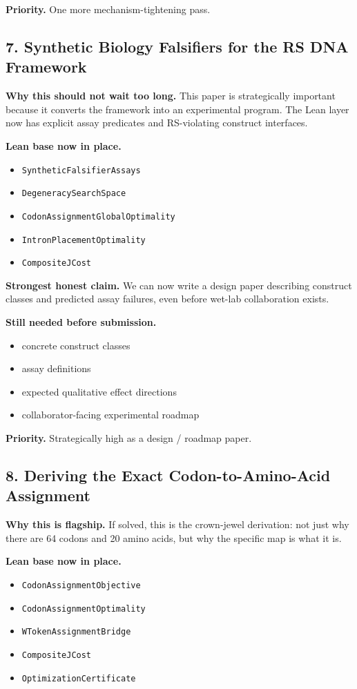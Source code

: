 \documentclass[11pt]{article}
\begin{document}
\textbf{Priority.} One more mechanism-tightening pass.

\subsection*{7. Synthetic Biology Falsifiers for the RS DNA Framework}
\textbf{Why this should not wait too long.} This paper is strategically important because it converts the framework into an experimental program. The Lean layer now has explicit assay predicates and RS-violating construct interfaces.

\textbf{Lean base now in place.}
\begin{itemize}
\item \texttt{SyntheticFalsifierAssays}
\item \texttt{DegeneracySearchSpace}
\item \texttt{CodonAssignmentGlobalOptimality}
\item \texttt{IntronPlacementOptimality}
\item \texttt{CompositeJCost}
\end{itemize}

\textbf{Strongest honest claim.} We can now write a design paper describing construct classes and predicted assay failures, even before wet-lab collaboration exists.

\textbf{Still needed before submission.}
\begin{itemize}
\item concrete construct classes
\item assay definitions
\item expected qualitative effect directions
\item collaborator-facing experimental roadmap
\end{itemize}

\textbf{Priority.} Strategically high as a design / roadmap paper.

\subsection*{8. Deriving the Exact Codon-to-Amino-Acid Assignment}
\textbf{Why this is flagship.} If solved, this is the crown-jewel derivation: not just why there are 64 codons and 20 amino acids, but why the specific map is what it is.

\textbf{Lean base now in place.}
\begin{itemize}
\item \texttt{CodonAssignmentObjective}
\item \texttt{CodonAssignmentOptimality}
\item \texttt{WTokenAssignmentBridge}
\item \texttt{CompositeJCost}
\item \texttt{OptimizationCertificate}
\end{itemize}
\end{document}
